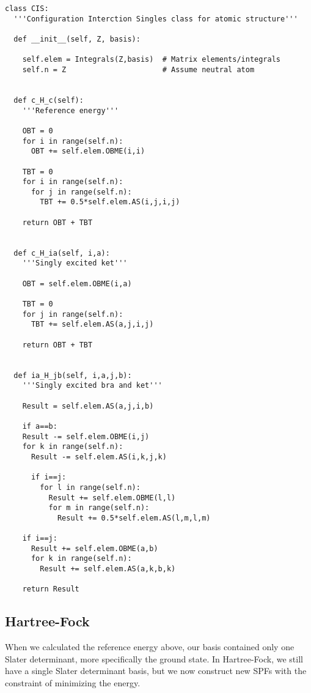 \lstset{basicstyle=\scriptsize}
\begin{lstlisting}
class CIS:
  '''Configuration Interction Singles class for atomic structure'''

  def __init__(self, Z, basis):

    self.elem = Integrals(Z,basis)  # Matrix elements/integrals
    self.n = Z                      # Assume neutral atom


  def c_H_c(self):
    '''Reference energy'''

    OBT = 0
    for i in range(self.n):
      OBT += self.elem.OBME(i,i)

    TBT = 0
    for i in range(self.n):
      for j in range(self.n):
        TBT += 0.5*self.elem.AS(i,j,i,j)

    return OBT + TBT


  def c_H_ia(self, i,a):
    '''Singly excited ket'''

    OBT = self.elem.OBME(i,a)

    TBT = 0
    for j in range(self.n):
      TBT += self.elem.AS(a,j,i,j)

    return OBT + TBT


  def ia_H_jb(self, i,a,j,b):
    '''Singly excited bra and ket'''

    Result = self.elem.AS(a,j,i,b)

    if a==b:
    Result -= self.elem.OBME(i,j)
    for k in range(self.n):
      Result -= self.elem.AS(i,k,j,k)

      if i==j:
        for l in range(self.n):
          Result += self.elem.OBME(l,l)
          for m in range(self.n):
            Result += 0.5*self.elem.AS(l,m,l,m)

    if i==j:
      Result += self.elem.OBME(a,b)
      for k in range(self.n):
        Result += self.elem.AS(a,k,b,k)

    return Result
\end{lstlisting}

\subsection{Hartree-Fock}
When we calculated the reference energy above, our basis contained only one Slater determinant, more specifically the ground state. In Hartree-Fock, we still have a single Slater determinant basis, but we now construct new SPFs with the constraint of minimizing the energy. 

